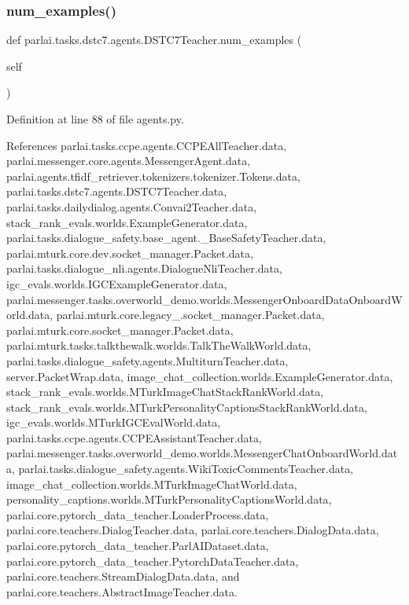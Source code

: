 \subsubsection{\texorpdfstring{num\+\_\+examples()}{num\_examples()}}
{\footnotesize\ttfamily def parlai.\+tasks.\+dstc7.\+agents.\+D\+S\+T\+C7\+Teacher.\+num\+\_\+examples (\begin{DoxyParamCaption}\item[{}]{self }\end{DoxyParamCaption})}



Definition at line 88 of file agents.\+py.



References parlai.\+tasks.\+ccpe.\+agents.\+C\+C\+P\+E\+All\+Teacher.\+data, parlai.\+messenger.\+core.\+agents.\+Messenger\+Agent.\+data, parlai.\+agents.\+tfidf\+\_\+retriever.\+tokenizers.\+tokenizer.\+Tokens.\+data, parlai.\+tasks.\+dstc7.\+agents.\+D\+S\+T\+C7\+Teacher.\+data, parlai.\+tasks.\+dailydialog.\+agents.\+Convai2\+Teacher.\+data, stack\+\_\+rank\+\_\+evals.\+worlds.\+Example\+Generator.\+data, parlai.\+tasks.\+dialogue\+\_\+safety.\+base\+\_\+agent.\+\_\+\+Base\+Safety\+Teacher.\+data, parlai.\+mturk.\+core.\+dev.\+socket\+\_\+manager.\+Packet.\+data, parlai.\+tasks.\+dialogue\+\_\+nli.\+agents.\+Dialogue\+Nli\+Teacher.\+data, igc\+\_\+evals.\+worlds.\+I\+G\+C\+Example\+Generator.\+data, parlai.\+messenger.\+tasks.\+overworld\+\_\+demo.\+worlds.\+Messenger\+Onboard\+Data\+Onboard\+World.\+data, parlai.\+mturk.\+core.\+legacy\+\_.\+socket\+\_\+manager.\+Packet.\+data, parlai.\+mturk.\+core.\+socket\+\_\+manager.\+Packet.\+data, parlai.\+mturk.\+tasks.\+talkthewalk.\+worlds.\+Talk\+The\+Walk\+World.\+data, parlai.\+tasks.\+dialogue\+\_\+safety.\+agents.\+Multiturn\+Teacher.\+data, server.\+Packet\+Wrap.\+data, image\+\_\+chat\+\_\+collection.\+worlds.\+Example\+Generator.\+data, stack\+\_\+rank\+\_\+evals.\+worlds.\+M\+Turk\+Image\+Chat\+Stack\+Rank\+World.\+data, stack\+\_\+rank\+\_\+evals.\+worlds.\+M\+Turk\+Personality\+Captions\+Stack\+Rank\+World.\+data, igc\+\_\+evals.\+worlds.\+M\+Turk\+I\+G\+C\+Eval\+World.\+data, parlai.\+tasks.\+ccpe.\+agents.\+C\+C\+P\+E\+Assistant\+Teacher.\+data, parlai.\+messenger.\+tasks.\+overworld\+\_\+demo.\+worlds.\+Messenger\+Chat\+Onboard\+World.\+data, parlai.\+tasks.\+dialogue\+\_\+safety.\+agents.\+Wiki\+Toxic\+Comments\+Teacher.\+data, image\+\_\+chat\+\_\+collection.\+worlds.\+M\+Turk\+Image\+Chat\+World.\+data, personality\+\_\+captions.\+worlds.\+M\+Turk\+Personality\+Captions\+World.\+data, parlai.\+core.\+pytorch\+\_\+data\+\_\+teacher.\+Loader\+Process.\+data, parlai.\+core.\+teachers.\+Dialog\+Teacher.\+data, parlai.\+core.\+teachers.\+Dialog\+Data.\+data, parlai.\+core.\+pytorch\+\_\+data\+\_\+teacher.\+Parl\+A\+I\+Dataset.\+data, parlai.\+core.\+pytorch\+\_\+data\+\_\+teacher.\+Pytorch\+Data\+Teacher.\+data, parlai.\+core.\+teachers.\+Stream\+Dialog\+Data.\+data, and parlai.\+core.\+teachers.\+Abstract\+Image\+Teacher.\+data.



